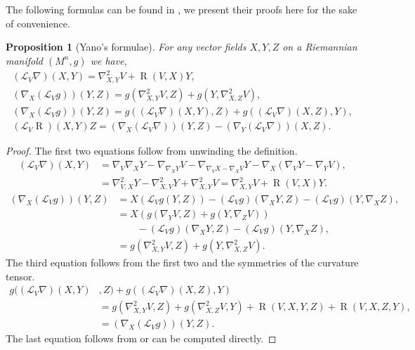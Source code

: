 \documentclass{amsart}
\newcommand{\lie}[1]{\mathcal{L}_{#1}}
\newcommand{\brackets}[1]{\left( #1 \right)}
\DeclareMathOperator*{\curvature}{R}
\theoremstyle{plain}
\newtheorem{proposition}{Proposition}
\theoremstyle{plain}
\theoremstyle{plain}
\theoremstyle{plain}
\theoremstyle{remark}
\begin{document}
The following formulas can be found in \cite{MR284950}, we present their proofs here for the sake of convenience.
\begin{proposition}[Yano's formulae]\label{Yano}
 For any vector fields $X, Y, Z$ on  a Riemannian manifold $(M^n,g)$ we have, 
 \begin{gather}
        \label{eqn: lie V of nabla}
            \left( \lie{V} \nabla \right) (X,Y) = \nabla^2_{X,Y} V + \curvature(V,X)Y, \\
        \label{eqn: Nabla X of L V g}
            \left( \nabla_X \left( \lie{V}g \right) \right) (Y,Z) 
                = g( \nabla^2_{X,Y} V, Z ) + g( Y, \nabla^2_{X,Z} V ),\\
        \label{eqn: Yano commutation formula}
            \left( \nabla_X \left( \lie{V}g \right) \right) (Y,Z) = 
                g \left( \left( \lie{V} \nabla \right) (X,Y) , Z \right) + 
                g \left( \left( \lie{V} \nabla \right) (X,Z) , Y \right), \\
        \label{eqn: Lie V of curvature}
            (\lie{V}\curvature)(X,Y) Z = \left( \nabla_X \left( \lie{V}\nabla \right) \right) (Y,Z) -
        \left( \nabla_Y \left( \lie{V}\nabla \right) \right) (X,Z) .
    \end{gather}
\end{proposition}
\begin{proof}
    The first two equations follow from unwinding the definition.
    \begin{align*}
        \left( \lie{V} \nabla \right) (X,Y) 
            &= \nabla_V \nabla_X Y - \nabla_{\nabla_X Y} V 
                - \nabla_{\nabla_V X - \nabla_X V} Y - \nabla_X (\nabla_V Y - \nabla_Y V), \\
            &= \nabla^2_{V,X} Y - \nabla^2_{X,V} Y + \nabla^2_{X,Y}V = \nabla^2_{X,Y} V + \curvature(V,X)Y .
    \end{align*}
    \begin{align*}
        \left( \nabla_X \left( \lie{V}g \right) \right) (Y,Z)
            &= X \brackets{ \lie{V}g (Y,Z) } - (\lie{V}g)(\nabla_X Y,Z) - (\lie{V}g)(Y, \nabla_X Z), \\
            &= X \brackets{ g(\nabla_Y V, Z) + g(Y, \nabla_Z V) } 
            \\ &\qquad - (\lie{V}g)(\nabla_X Y,Z) - (\lie{V}g)(Y, \nabla_X Z), \\
            &= g( \nabla^2_{X,Y} V ,Z ) + g( Y, \nabla^2_{X,Z} V ).
    \end{align*}
    The third equation follows from the first two and the symmetries of the curvature tensor.
    \begin{align*}
        g ( ( \lie{V} \nabla ) (X,Y) &, Z ) 
            + g \left( \left( \lie{V} \nabla \right) (X,Z) , Y \right) \\ 
                &= g(\nabla^2_{X,Y} V,Z) + g(\nabla^2_{X,Z} V,Y) 
                		+ \curvature(V,X,Y,Z) +\curvature(V,X,Z,Y), \\
                &= \left( \nabla_X \left( \lie{V}g \right) \right) (Y,Z).
    \end{align*}
    The last equation follows from \cite[eqn 5.16]{MR284950} or can be computed directly. 
\end{proof}
\end{document}
